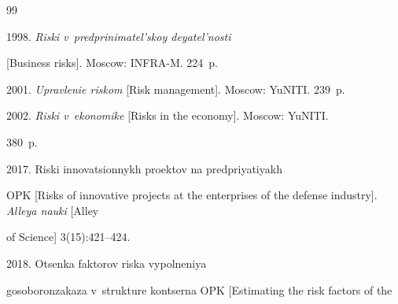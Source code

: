 












\renewcommand{\bibname}{\protect\rmfamily References}







{\small\frenchspacing


{%




\begin{thebibliography}{99}




 1998. \textit{Riski v~predprinimatel'skoy deyatel'nosti} 


[Business risks]. Moscow: INFRA-M. 224~p. 







 2001. \textit{Upravlenie riskom} [Risk management]. Moscow: YuNITI. 239~p. 







 2002. \textit{Riski v~ekonomike} [Risks in the economy]. Moscow: YuNITI. 


380~p. 







 2017. Riski innovatsionnykh proektov na predpriyatiyakh 


OPK [Risks of innovative projects at the enterprises of the defense industry]. \textit{Alleya nauki} [Alley 


of Science] 3(15):421--424.




 2018. Otsenka faktorov riska vypolneniya 


gos\-obo\-ron\-za\-ka\-za v~strukture kontserna OPK [Estimating the risk factors of the 



\end{thebibliography}}}
